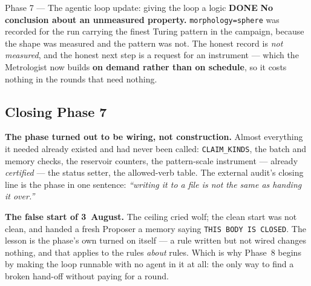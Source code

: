 \documentclass[11pt,a4paper]{article}
\newcommand{\code}[1]{\texttt{#1}}
\newcommand{\done}{\textcolor{good}{\textbf{DONE}}}
\begin{document}
\begin{phasebox}{Phase 7 --- The agentic loop update: giving the loop a logic \hfill \done}
\textbf{No conclusion about an unmeasured property.} \code{morphology=sphere} was recorded for the
run carrying the finest Turing pattern in the campaign, because the shape was measured and the
pattern was not. The honest record is \emph{not measured}, and the honest next step is a request
for an instrument --- which the Metrologist now builds \textbf{on demand rather than on schedule},
so it costs nothing in the rounds that need nothing.

\subsection*{Closing Phase 7}
\textbf{The phase turned out to be wiring, not construction.} Almost everything it needed already
existed and had never been called: \code{CLAIM\_KINDS}, the batch and memory checks, the reservoir
counters, the pattern-scale instrument --- already \emph{certified} --- the status setter, the
allowed-verb table. The external audit's closing line is the phase in one sentence:
\emph{``writing it to a file is not the same as handing it over.''}

\textbf{The false start of 3~August.} The ceiling cried wolf; the clean start was not clean, and
handed a fresh Proposer a memory saying \code{THIS BODY IS CLOSED}. The lesson is the phase's own
turned on itself --- a rule written but not wired changes nothing, and that applies to the rules
\emph{about} rules. Which is why Phase~8 begins by making the loop runnable with no agent in it at
all: the only way to find a broken hand-off without paying for a round.
\end{phasebox}
\end{document}
